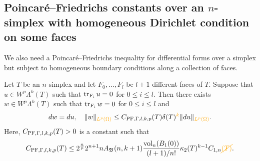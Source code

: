\documentclass[10pt,letterpaper]{article}
\newcommand\cye[1]{%
  \protect\leavevmode
  \begingroup
    \color{red!35!yellow}%
    #1%
  \endgroup
}
\begin{document}
\subsection{\cye{Poincar\'e--Friedrichs constants over an $n$-simplex with homogeneous Dirichlet condition on some faces}}


We also need a Poincar\'e--Friedrichs inequality for differential forms over a simplex but subject to homogeneous boundary conditions along a collection of faces. 

\begin{lemma}\label{lemma:mixedbconsimplex:exteriorderivative}
    Let $T$ be an $n$-simplex 
    and let $F_{0},\dots,F_{l}$ be $l+1$ different faces of $T$. 
    Suppose that $u \in W^{p}\Lambda^{k}(T)$ such that 
    $\operatorname{tr}_{F_i} u = 0$ for $0 \leq i \leq l$.
    Then there exists $w \in W^{p}\Lambda^{k}(T)$ such that 
    $\operatorname{tr}_{F_i} w = 0$ for $0 \leq i \leq l$
    and  
    \begin{align*}
        \cartan w = \cartan u,
        \quad 
        \| w \|_{\cye{L^{p}(\Omega)}}
        \leq 
        C_{\PF,\Gamma,l,k,p}(T)
        \diam(T)^{\cye{k}} 
        \| \cartan u \|_{\cye{L^{p}(\Omega)}}
        .
    \end{align*}
    Here, $C_{{\rm PF},\Gamma,l,k,p}(T) > 0$ is a constant such that 
    \begin{align*}
        C_{\PF,\Gamma,l,k,p}(T)
        \leq 
        2^{\frac n p}
        2^{n+1} n A_{\Bogov}(n,k+1) \frac{ \vol_{n}(B_1(0)) }{ (l+1)/n! } 
        \kappa_{2}(T)^{k-1}
        \Ceins{n}\cye{\cancel{(T)}}
        .
    \end{align*}
\end{lemma}
\end{document}
